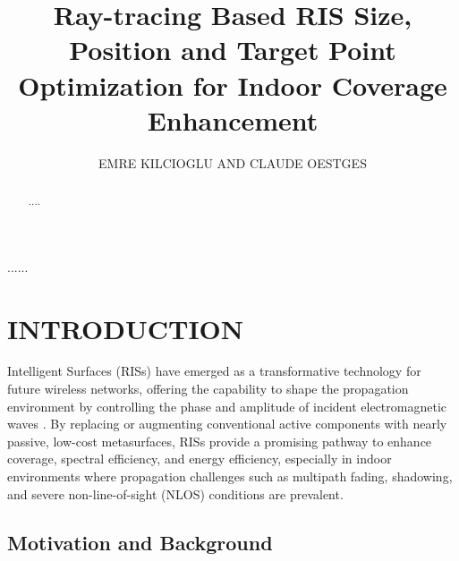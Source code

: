 \documentclass{IEEEoj}
\begin{document}

\title{Ray-tracing Based RIS Size, Position and Target Point Optimization for Indoor Coverage Enhancement}

\author{EMRE KILCIOGLU AND CLAUDE OESTGES}

\begin{abstract}
....
\end{abstract}

\begin{IEEEkeywords}
......
\end{IEEEkeywords}


\maketitle

\section{INTRODUCTION}

 Intelligent Surfaces (RISs) have emerged as a transformative technology for future wireless networks, offering the capability to shape the propagation environment by controlling the phase and amplitude of incident electromagnetic waves \cite{renzo2020smart, wu2021intelligent}. By replacing or augmenting conventional active components with nearly passive, low-cost metasurfaces, RISs provide a promising pathway to enhance coverage, spectral efficiency, and energy efficiency, especially in indoor environments where propagation challenges such as multipath fading, shadowing, and severe non-line-of-sight (NLOS) conditions are prevalent.

\subsection{Motivation and Background}
\end{document}
